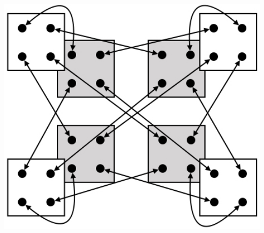 \documentclass{beamer}
\begin{document}
\begin{frame}
\begin{columns}
\begin{column}{0.3\textwidth}
\begin{center}
\end{center}
\begin{center}
	\includegraphics[width=1.0\textwidth]{inter_layer_nlnr}
\end{center}
\end{column}

\end{columns}

\end{frame}

\end{document}

